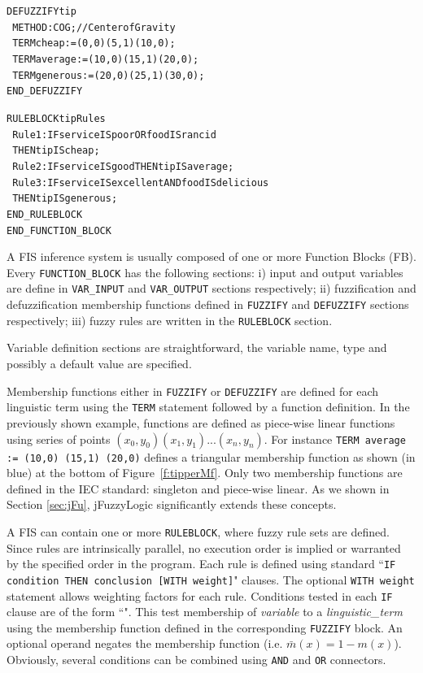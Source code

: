 \documentclass[11pt,twoside]{article}
\begin{document}
\begin{multicols}{2}
\begin{tiny}
\begin{alltt}
DEFUZZIFY tip
\ 	METHOD : COG;			// Center of Gravity
\ 	TERM cheap := (0,0) (5,1) (10,0);
\ 	TERM average := (10,0) (15,1) (20,0);
\ 	TERM generous := (20,0) (25,1) (30,0);
END\_DEFUZZIFY

RULEBLOCK tipRules
\ 	Rule1: IF service IS poor OR food IS rancid 
\            THEN tip IS cheap;
\ 	Rule2: IF service IS good THEN tip IS average;
\ 	Rule3: IF service IS excellent AND food IS delicious 
\            THEN tip IS generous;
END\_RULEBLOCK
END\_FUNCTION\_BLOCK
\end{alltt}
\end{tiny}

A FIS inference system is usually composed of one or more Function Blocks (FB).
Every \texttt{FUNCTION\_BLOCK} has the following sections: i) input and output variables are define in \texttt{VAR\_INPUT} and \texttt{VAR\_OUTPUT} sections respectively; ii) fuzzification and defuzzification membership functions defined in \texttt{FUZZIFY} and \texttt{DEFUZZIFY} sections respectively; iii) fuzzy rules are written in the \texttt{RULEBLOCK} section.

Variable definition sections are straightforward, the variable name, type and possibly a default value are specified.

Membership functions either in \texttt{FUZZIFY} or \texttt{DEFUZZIFY} are defined for each linguistic term using the \texttt{TERM} statement followed by a function definition. 
In the previously shown example, functions are defined as piece-wise linear functions using series of points $(x_0,y_0) (x_1,y_1) ... (x_n, y_n)$. 
For instance \texttt{TERM average := (10,0) (15,1) (20,0)} defines a triangular membership function as shown (in blue) at the bottom of Figure~\ref{f:tipperMf}. 
Only two membership functions are defined in the IEC standard: singleton and piece-wise linear. 
As we shown in Section \ref{sec:jFu}, jFuzzyLogic significantly extends these concepts.

A FIS can contain one or more \texttt{RULEBLOCK}, where fuzzy rule sets are defined. 
Since rules are intrinsically parallel, no execution order is implied or warranted by the specified order in the program. 
Each rule is defined using standard ``\texttt{IF condition THEN conclusion  [WITH weight]}" clauses. 
The optional \texttt{WITH weight} statement allows weighting factors for each rule. 
Conditions tested in each \texttt{IF} clause are of the form ``". 
This test membership of \textit{variable} to a \textit{linguistic\_term} using the membership function defined in the corresponding \texttt{FUZZIFY} block.
An optional  operand negates the membership function (i.e. $\bar{m}(x) = 1 - m(x)$).
Obviously, several conditions can be combined using \texttt{AND} and \texttt{OR} connectors.


\end{multicols}
\end{document}
